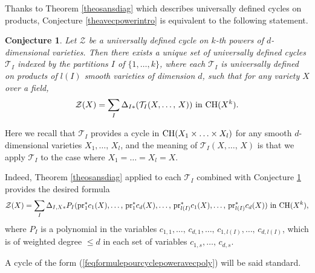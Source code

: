 \documentclass[10pt]{article}
\newtheorem{conj}[theo]{Conjecture}
\begin{document}
Thanks to Theorem \ref{theosansdiag}   which describes universally defined cycles on products, Conjecture  \ref{theavecpowerintro} is equivalent to the following statement.
\begin{conj}\label{theomainwithpowers} Let $\mathcal{Z}$ be a universally defined cycle on $k$-th powers of $d$-dimensional varieties. Then there
exists a unique set of   universally defined cycles $\mathcal{T}_I$ indexed by the partitions $I$ of $\{1,\ldots,k\}$, where each $\mathcal{T}_I$
is universally defined on products of $l(I)$ smooth  varieties of dimension $d$, such that for any variety $X$ over a field,
\begin{eqnarray}\label{feqformulepourcyclepower} \mathcal{Z}({X})=\sum_I\Delta_{I*}(\mathcal{T}_I(X,\ldots,\, X)) \,\,{\rm in}\,\,{\rm CH}(X^k).
\end{eqnarray}
\end{conj}
Here we recall that $\mathcal{T}_I$ provides a cycle in ${\rm CH}(X_1\times \ldots\times X_l)$ for any smooth $d$-dimensional varieties
$X_1,\ldots, \,X_l$, and the meaning of  $\mathcal{T}_I(X,\ldots,\, X)$ is that we apply $\mathcal{T}_I$ to the case where $X_1=\ldots=X_l=X$.

Indeed, Theorem \ref{theosansdiag} applied to each $\mathcal{T}_I$ combined with Conjecture \ref{theomainwithpowers}  provides the desired formula
\begin{eqnarray}\label{feqformulepourcyclepoweravecpoly} \mathcal{Z}(X)=\sum_I\Delta_{I,X*}P_I({\rm pr}_1^*c_{1}(X),\ldots,\,{\rm pr}_1^*c_{d}(X),\ldots,\,{\rm pr}_{l(I)}^*c_{1}(X),\ldots,\,{\rm pr}_{l(I)}^*c_{d}(X) )\,\,{\rm in}\,\,{\rm CH}(X^k),
\end{eqnarray}
where  $P_I$ is a polynomial  in the variables
 $c_{1,1},\ldots,\,c_{d,1},\ldots,\,c_{1,l(I)},\ldots,\,c_{d,l(I)}$, which is of weighted degree $\leq d$ in each set
 of variables $c_{1,s},\ldots,\,c_{d,s}$.


 A cycle of the form (\ref{feqformulepourcyclepoweravecpoly}) will be said standard.
\end{document}
